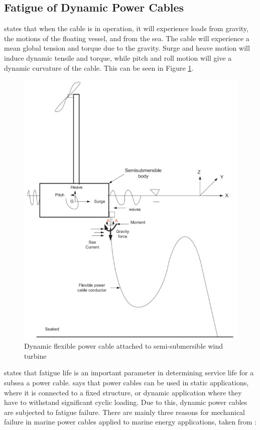 \subsection{Fatigue of Dynamic Power Cables}
\noindent \cite{Nasution2013} states that when the cable is in operation, it will experience loads from gravity, the motions of the floating vessel, and from the sea. The cable will experience a mean global tension and torque due to the gravity. Surge and heave motion will induce dynamic tensile and torque, while pitch and roll motion will give a dynamic curvature of the cable. This can be seen in Figure \ref{fig:float}. 

\begin{figure}[H]
\centering
\includegraphics[scale=0.7]{figures/float}
\caption[$\; \:$Dynamic flexible power cable attached to semi-submersible wind turbine]{Dynamic flexible power cable attached to semi-submersible wind turbine \cite{Nasution2013}}
 \label{fig:float}
\end{figure}
\noindent \cite{YangShun-Han2017} states that fatigue life is an important parameter in determining service life for a subsea a power cable. \cite{Thies2012} says that power cables can be used in static applications, where it is connected to a fixed structure, or dynamic application where they have to withstand significant cyclic loading. Due to this, dynamic power cables are subjected to fatigue failure.
There are mainly three reasons for mechanical failure in marine power cables applied to marine energy applications, taken from \cite{Thies2012} :

